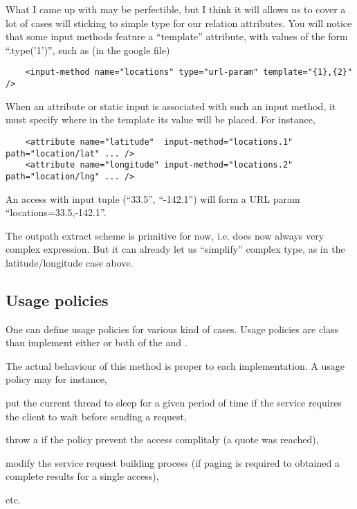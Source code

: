 What I came up with may be perfectible, but I think it will allows us
to cover a lot of cases will sticking to simple type for our relation
attributes.
You will notice that some input methods feature a ``template''
attribute, with values of the form ``.type('{1}')'', such as (in the
google file)

\begin{verbatim}
    <input-method name="locations" type="url-param" template="{1},{2}"  />
\end{verbatim}

When an attribute or static input is associated with such an input
method, it must specify where in the template its value will be
placed. For instance, 

\begin{verbatim}
    <attribute name="latitude"  input-method="locations.1" path="location/lat" ... />
    <attribute name="longitude" input-method="locations.2" path="location/lng" ... /> 
\end{verbatim}

An access with input tuple (``33.5'', ``-142.1'') will form a URL
param ``locations=33.5,-142.1''.

The outpath extract scheme is primitive for now, i.e. does now always
very complex expression. But it can already let us ``simplify''
complex type, as in the latitude/longitude case above.

\subsection{Usage policies}

One can define usage policies for various kind of cases. Usage
policies are class than implement either or both of the
 and .

The actual behaviour of this method is proper to each implementation.
A usage policy may for instance,
\begin{inparaenum}[(i)]
  \item put the current thread to sleep for a given period of time if
    the service requires the client to wait before sending a request,
  \item throw a  if the policy
    prevent the access complitaly (\eg a quote was reached),
  \item modify the service request building process (\eg if paging is
    required to obtained a complete results for a single access),
\end{inparaenum}
etc.

